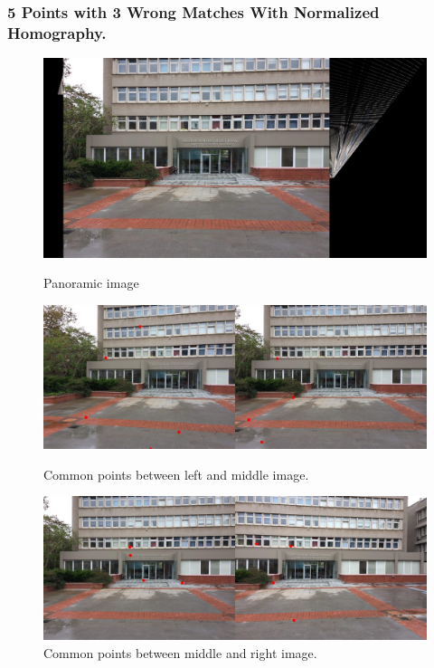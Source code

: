 \documentclass[letterpaper,12pt]{article}
\begin{document}
\subsubsection{5 Points with 3 Wrong Matches With Normalized Homography.}
\begin{figure}[!htb]
        \centering\includegraphics[width=1\columnwidth]{experiments/5points/norm/final3wrong.jpg}
          \caption{
                \label{} Panoramic image
        }
        \centering\includegraphics[width=1\columnwidth]{experiments/5points/norm/left-1_middle3wrong.jpg}
          \caption{
                \label{} Common points between left and middle image.
        }
        \centering\includegraphics[width=1\columnwidth]{experiments/5points/norm/middle_left-13wrong.jpg}
        \caption{
                \label{} Common points between middle and right image.
        }
\end{figure}
\FloatBarrier
\newpage
\end{document}
